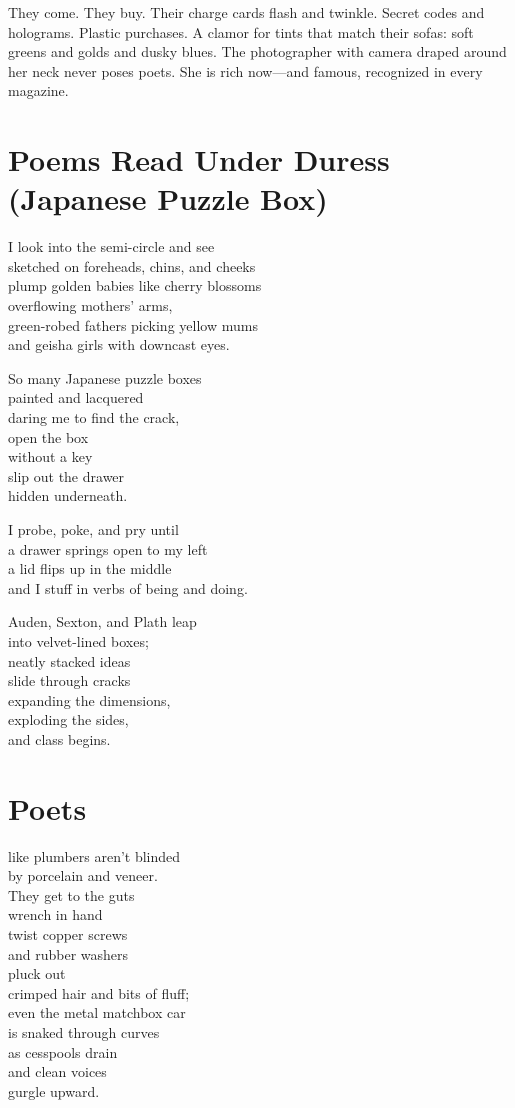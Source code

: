\documentclass[twoside,10pt]{book}
\begin{document}
They come. They buy. Their charge cards flash and twinkle. Secret codes
and holograms. Plastic purchases. A clamor for tints that match their
sofas: soft greens and golds and dusky blues. The photographer with
camera draped around her neck never poses poets. She is rich now---and
famous, recognized in every magazine.


\clearpage
\section{Poems Read Under Duress\\ (Japanese Puzzle Box)}

I look into the semi-circle and see\\
sketched on foreheads, chins, and cheeks\\
plump golden babies like cherry blossoms\\
overflowing mothers' arms,\\
green-robed fathers picking yellow mums\\
and geisha girls with downcast eyes.

So many Japanese puzzle boxes\\
painted and lacquered\\
daring me to find the crack,\\
open the box\\
without a key\\
slip out the drawer\\
hidden underneath.

I probe, poke, and pry until\\
a drawer springs open to my left\\
a lid flips up in the middle\\
and I stuff in verbs of being and doing.

Auden, Sexton, and Plath leap\\
into velvet-lined boxes;\\
neatly stacked ideas\\
slide through cracks\\
expanding the dimensions,\\
exploding the sides,\\
and class begins.


\clearpage
\section{Poets}

like plumbers aren't blinded\\
by porcelain and veneer.\\
They get to the guts\\
wrench in hand\\
twist copper screws\\
and rubber washers\\
pluck out\\
crimped hair and bits of fluff;\\
even the metal matchbox car\\
is snaked through curves\\
as cesspools drain\\
and clean voices\\
gurgle upward.
\end{document}
